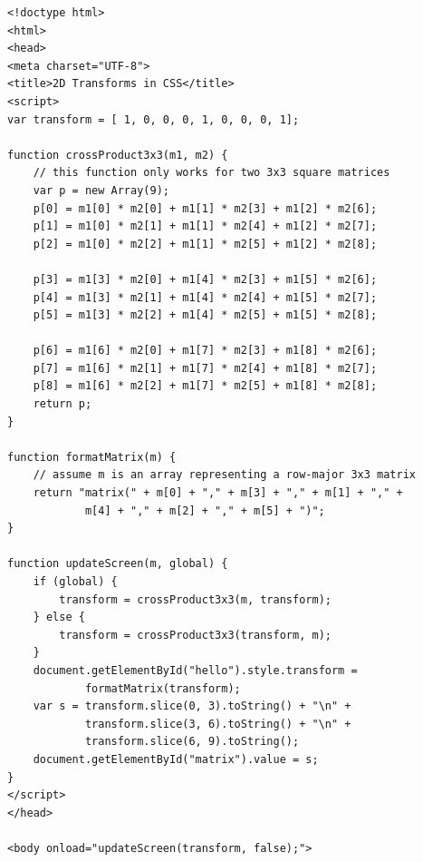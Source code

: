\documentclass{book}
\begin{document}
\begin{lstlisting}
<!doctype html>
<html>
<head>
<meta charset="UTF-8">
<title>2D Transforms in CSS</title>
<script>
var transform = [ 1, 0, 0, 0, 1, 0, 0, 0, 1];
    
function crossProduct3x3(m1, m2) {
    // this function only works for two 3x3 square matrices
    var p = new Array(9);
    p[0] = m1[0] * m2[0] + m1[1] * m2[3] + m1[2] * m2[6];
    p[1] = m1[0] * m2[1] + m1[1] * m2[4] + m1[2] * m2[7];
    p[2] = m1[0] * m2[2] + m1[1] * m2[5] + m1[2] * m2[8];

    p[3] = m1[3] * m2[0] + m1[4] * m2[3] + m1[5] * m2[6];
    p[4] = m1[3] * m2[1] + m1[4] * m2[4] + m1[5] * m2[7];
    p[5] = m1[3] * m2[2] + m1[4] * m2[5] + m1[5] * m2[8];

    p[6] = m1[6] * m2[0] + m1[7] * m2[3] + m1[8] * m2[6];
    p[7] = m1[6] * m2[1] + m1[7] * m2[4] + m1[8] * m2[7];
    p[8] = m1[6] * m2[2] + m1[7] * m2[5] + m1[8] * m2[8];
    return p;
}

function formatMatrix(m) {
    // assume m is an array representing a row-major 3x3 matrix
    return "matrix(" + m[0] + "," + m[3] + "," + m[1] + "," +
            m[4] + "," + m[2] + "," + m[5] + ")";
}

function updateScreen(m, global) {
    if (global) {
        transform = crossProduct3x3(m, transform);
    } else {
        transform = crossProduct3x3(transform, m);
    }
    document.getElementById("hello").style.transform =
            formatMatrix(transform);
    var s = transform.slice(0, 3).toString() + "\n" +
            transform.slice(3, 6).toString() + "\n" +
            transform.slice(6, 9).toString();
    document.getElementById("matrix").value = s;
}
</script>
</head>

<body onload="updateScreen(transform, false);">


\end{lstlisting}
\end{document}
